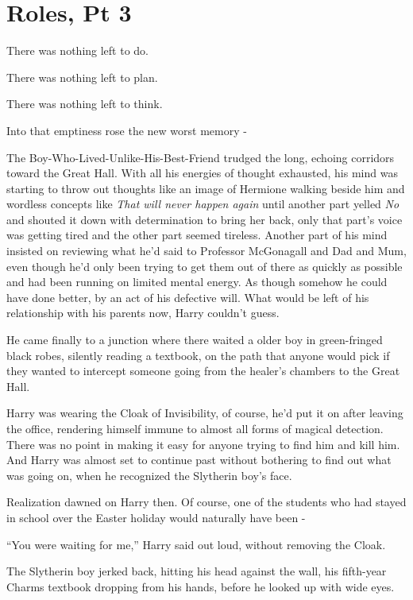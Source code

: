 \chapter{Roles, Pt 3}\label{roles-pt-3}

There was nothing left to do.

There was nothing left to plan.

There was nothing left to think.

Into that emptiness rose the new worst memory -

The Boy-Who-Lived-Unlike-His-Best-Friend trudged the long, echoing
corridors toward the Great Hall. With all his energies of thought
exhausted, his mind was starting to throw out thoughts like an image of
Hermione walking beside him and wordless concepts like \emph{That will
never happen again} until another part yelled \emph{No} and shouted it
down with determination to bring her back, only that part's voice was
getting tired and the other part seemed tireless. Another part of his
mind insisted on reviewing what he'd said to Professor McGonagall and
Dad and Mum, even though he'd only been trying to get them out of there
as quickly as possible and had been running on limited mental energy. As
though somehow he could have done better, by an act of his defective
will. What would be left of his relationship with his parents now, Harry
couldn't guess.

He came finally to a junction where there waited a older boy in
green-fringed black robes, silently reading a textbook, on the path that
anyone would pick if they wanted to intercept someone going from the
healer's chambers to the Great Hall.

Harry was wearing the Cloak of Invisibility, of course, he'd put it on
after leaving the office, rendering himself immune to almost all forms
of magical detection. There was no point in making it easy for anyone
trying to find him and kill him. And Harry was almost set to continue
past without bothering to find out what was going on, when he recognized
the Slytherin boy's face.

Realization dawned on Harry then. Of course, one of the students who had
stayed in school over the Easter holiday would naturally have been -

``You were waiting for me,'' Harry said out loud, without removing the
Cloak.

The Slytherin boy jerked back, hitting his head against the wall, his
fifth-year Charms textbook dropping from his hands, before he looked up
with wide eyes.

